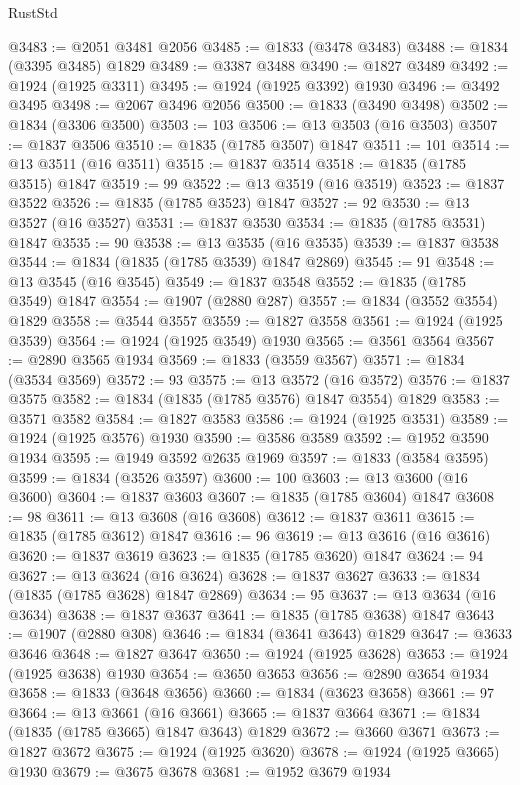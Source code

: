 \begin{lexlean}{RustStd}
\begin{coremodule}
@3483 := @2051 @3481 @2056
@3485 := @1833 (@3478 @3483)
@3488 := @1834 (@3395 @3485) @1829
@3489 := @3387 @3488
@3490 := @1827 @3489
@3492 := @1924 (@1925 @3311)
@3495 := @1924 (@1925 @3392) @1930
@3496 := @3492 @3495
@3498 := @2067 @3496 @2056
@3500 := @1833 (@3490 @3498)
@3502 := @1834 (@3306 @3500)
@3503 := 103
@3506 := @13 @3503 (@16 @3503)
@3507 := @1837 @3506
@3510 := @1835 (@1785 @3507) @1847
@3511 := 101
@3514 := @13 @3511 (@16 @3511)
@3515 := @1837 @3514
@3518 := @1835 (@1785 @3515) @1847
@3519 := 99
@3522 := @13 @3519 (@16 @3519)
@3523 := @1837 @3522
@3526 := @1835 (@1785 @3523) @1847
@3527 := 92
@3530 := @13 @3527 (@16 @3527)
@3531 := @1837 @3530
@3534 := @1835 (@1785 @3531) @1847
@3535 := 90
@3538 := @13 @3535 (@16 @3535)
@3539 := @1837 @3538
@3544 := @1834 (@1835 (@1785 @3539) @1847 @2869)
@3545 := 91
@3548 := @13 @3545 (@16 @3545)
@3549 := @1837 @3548
@3552 := @1835 (@1785 @3549) @1847
@3554 := @1907 (@2880 @287)
@3557 := @1834 (@3552 @3554) @1829
@3558 := @3544 @3557
@3559 := @1827 @3558
@3561 := @1924 (@1925 @3539)
@3564 := @1924 (@1925 @3549) @1930
@3565 := @3561 @3564
@3567 := @2890 @3565 @1934
@3569 := @1833 (@3559 @3567)
@3571 := @1834 (@3534 @3569)
@3572 := 93
@3575 := @13 @3572 (@16 @3572)
@3576 := @1837 @3575
@3582 := @1834 (@1835 (@1785 @3576) @1847 @3554) @1829
@3583 := @3571 @3582
@3584 := @1827 @3583
@3586 := @1924 (@1925 @3531)
@3589 := @1924 (@1925 @3576) @1930
@3590 := @3586 @3589
@3592 := @1952 @3590 @1934
@3595 := @1949 @3592 @2635 @1969
@3597 := @1833 (@3584 @3595)
@3599 := @1834 (@3526 @3597)
@3600 := 100
@3603 := @13 @3600 (@16 @3600)
@3604 := @1837 @3603
@3607 := @1835 (@1785 @3604) @1847
@3608 := 98
@3611 := @13 @3608 (@16 @3608)
@3612 := @1837 @3611
@3615 := @1835 (@1785 @3612) @1847
@3616 := 96
@3619 := @13 @3616 (@16 @3616)
@3620 := @1837 @3619
@3623 := @1835 (@1785 @3620) @1847
@3624 := 94
@3627 := @13 @3624 (@16 @3624)
@3628 := @1837 @3627
@3633 := @1834 (@1835 (@1785 @3628) @1847 @2869)
@3634 := 95
@3637 := @13 @3634 (@16 @3634)
@3638 := @1837 @3637
@3641 := @1835 (@1785 @3638) @1847
@3643 := @1907 (@2880 @308)
@3646 := @1834 (@3641 @3643) @1829
@3647 := @3633 @3646
@3648 := @1827 @3647
@3650 := @1924 (@1925 @3628)
@3653 := @1924 (@1925 @3638) @1930
@3654 := @3650 @3653
@3656 := @2890 @3654 @1934
@3658 := @1833 (@3648 @3656)
@3660 := @1834 (@3623 @3658)
@3661 := 97
@3664 := @13 @3661 (@16 @3661)
@3665 := @1837 @3664
@3671 := @1834 (@1835 (@1785 @3665) @1847 @3643) @1829
@3672 := @3660 @3671
@3673 := @1827 @3672
@3675 := @1924 (@1925 @3620)
@3678 := @1924 (@1925 @3665) @1930
@3679 := @3675 @3678
@3681 := @1952 @3679 @1934

\end{coremodule}
\end{lexlean}
